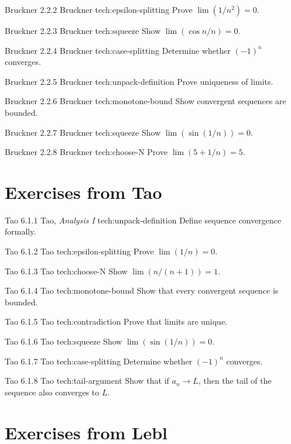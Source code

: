 \seqex
{Bruckner 2.2.2}
{Bruckner}
{tech:epsilon-splitting}
{Prove $\lim (1/n^2)=0$.}

\seqex
{Bruckner 2.2.3}
{Bruckner}
{tech:squeeze}
{Show $\lim (\cos n/n)=0$.}

\seqex
{Bruckner 2.2.4}
{Bruckner}
{tech:case-splitting}
{Determine whether $(-1)^n$ converges.}

\seqex
{Bruckner 2.2.5}
{Bruckner}
{tech:unpack-definition}
{Prove uniqueness of limits.}

\seqex
{Bruckner 2.2.6}
{Bruckner}
{tech:monotone-bound}
{Show convergent sequences are bounded.}

\seqex
{Bruckner 2.2.7}
{Bruckner}
{tech:squeeze}
{Show $\lim (\sin(1/n))=0$.}

\seqex
{Bruckner 2.2.8}
{Bruckner}
{tech:choose-N}
{Prove $\lim (5+1/n)=5$.}


\section*{Exercises from Tao}

\seqex
{Tao 6.1.1}
{Tao, \textit{Analysis I}}
{tech:unpack-definition}
{Define sequence convergence formally.}

\seqex
{Tao 6.1.2}
{Tao}
{tech:epsilon-splitting}
{Prove $\lim (1/n)=0$.}

\seqex
{Tao 6.1.3}
{Tao}
{tech:choose-N}
{Show $\lim (n/(n+1))=1$.}

\seqex
{Tao 6.1.4}
{Tao}
{tech:monotone-bound}
{Show that every convergent sequence is bounded.}

\seqex
{Tao 6.1.5}
{Tao}
{tech:contradiction}
{Prove that limits are unique.}

\seqex
{Tao 6.1.6}
{Tao}
{tech:squeeze}
{Show $\lim (\sin(1/n))=0$.}

\seqex
{Tao 6.1.7}
{Tao}
{tech:case-splitting}
{Determine whether $(-1)^n$ converges.}

\seqex
{Tao 6.1.8}
{Tao}
{tech:tail-argument}
{Show that if $a_n\to L$, then the tail of the sequence also converges to $L$.}


\section*{Exercises from Lebl}

